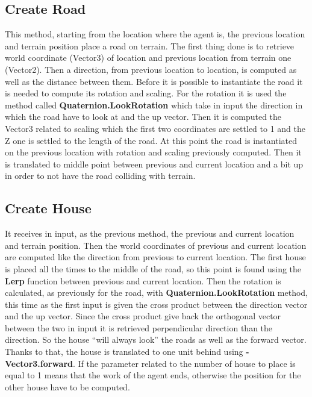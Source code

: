 \documentclass[12pt]{article}
\begin{document}
    \subsection{Create Road} \label{section:CreateRoad}
    This method, starting from the location where the agent is, the previous location and terrain position place a road on terrain. The first thing done is to retrieve 
    world coordinate (Vector3) of location and previous location from terrain one (Vector2). Then a direction, from previous location to location, is computed as well as the distance
    between them. Before it is possible to instantiate the road it is needed to compute its rotation and scaling. For the rotation it is used the 
    method called \textbf{Quaternion.LookRotation} which take in input the direction in which the road have to look at and the up vector. Then it is computed the Vector3
    related to scaling which the first two coordinates are settled to 1 and the Z one is settled to the length of the road. At this point the road is instantiated on the previous
    location with rotation and scaling previously computed. Then it is translated to middle point between previous and current location and a bit up in order to not have the 
    road colliding with terrain.

    \subsection{Create House} \label{section:CreateHouse}
    It receives in input, as the previous method, the previous and current location and terrain position. Then the world coordinates of previous and current location are 
    computed like the direction from previous to current location. The first house is placed all the times to the middle of the road, so this point is found using the \textbf{Lerp}
    function between previous and current location. Then the rotation is calculated, as previously for the road, with \textbf{Quaternion.LookRotation} method, this time as the
    first input is given the cross product between the direction vector and the up vector. Since the cross product give back the orthogonal vector between the two in input
    it is retrieved perpendicular direction than the direction. So the house ``will always look'' the roads as well as the forward vector. Thanks to that, the house is
    translated to one unit behind using \textbf{-Vector3.forward}. If the parameter related to the number of house to place is equal to 1 means that the work of the agent ends, 
    otherwise the position for the other house have to be computed. 
    
\end{document}
